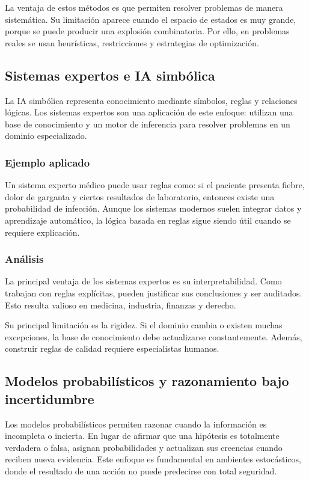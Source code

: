 La ventaja de estos métodos es que permiten resolver problemas de manera sistemática. Su limitación aparece cuando el espacio de estados es muy grande, porque se puede producir una explosión combinatoria. Por ello, en problemas reales se usan heurísticas, restricciones y estrategias de optimización.

\subsection{Sistemas expertos e IA simbólica}

La IA simbólica representa conocimiento mediante símbolos, reglas y relaciones lógicas. Los sistemas expertos son una aplicación de este enfoque: utilizan una base de conocimiento y un motor de inferencia para resolver problemas en un dominio especializado.

\subsubsection{Ejemplo aplicado}

Un sistema experto médico puede usar reglas como: si el paciente presenta fiebre, dolor de garganta y ciertos resultados de laboratorio, entonces existe una probabilidad de infección. Aunque los sistemas modernos suelen integrar datos y aprendizaje automático, la lógica basada en reglas sigue siendo útil cuando se requiere explicación.

\subsubsection{Análisis}

La principal ventaja de los sistemas expertos es su interpretabilidad. Como trabajan con reglas explícitas, pueden justificar sus conclusiones y ser auditados. Esto resulta valioso en medicina, industria, finanzas y derecho.

Su principal limitación es la rigidez. Si el dominio cambia o existen muchas excepciones, la base de conocimiento debe actualizarse constantemente. Además, construir reglas de calidad requiere especialistas humanos.

\subsection{Modelos probabilísticos y razonamiento bajo incertidumbre}

Los modelos probabilísticos permiten razonar cuando la información es incompleta o incierta. En lugar de afirmar que una hipótesis es totalmente verdadera o falsa, asignan probabilidades y actualizan sus creencias cuando reciben nueva evidencia. Este enfoque es fundamental en ambientes estocásticos, donde el resultado de una acción no puede predecirse con total seguridad.

